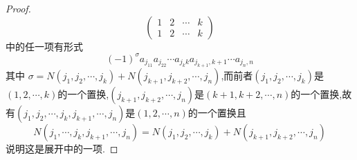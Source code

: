 {\begin{proof}
\[\begin{pmatrix}
                1 & 2 & \cdots & k \\
                1 & 2 & \cdots & k
            \end{pmatrix}
        \]
        中的任一项有形式
        \[
            \left(-1\right)^{\sigma}
            a_{j_11}a_{j_22}\cdots
            a_{j_kk}a_{j_{k+1},k+1}\cdots
            a_{j_n,n}
        \]
        其中
        $\sigma =N\left(
            j_1,j_2,\cdots,j_k
            \right)+N\left(
            j_{k+1},j_{k+2},\cdots,j_n
            \right)$,而前者$\left(j_1,j_2,\cdots,j_k\right)$是$\left(1,2,\cdots,k\right)$的一个置换,$\left(j_{k + 1},j_{k+2},\cdots,j_n\right)$是$\left(k+1,k+2,\cdots,n\right)$的一个置换,故有$\left(
            j_1,j_2,\cdots,j_k,j_{k+1},\cdots,j_n
            \right)$是$\left(1,2,\cdots,n\right)$的一个置换且
        \[
            N\left(j_1,\cdots,j_k,j_{k+1},\cdots,j_n\right)
            =N\left(j_1,j_2,\cdots,j_k\right)+
            N\left(j_{k+1},j_{k+2},\cdots,j_n\right)
        \]
        说明这是展开中的一项.


\end{proof}}
